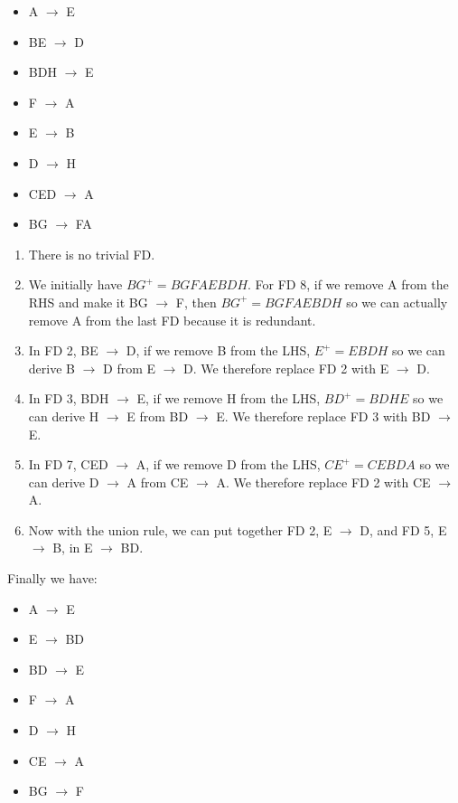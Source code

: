 \documentclass[11pt]{article}
\begin{document}
\begin{enumerate}
{{\begin{itemize}
  \item A $\rightarrow$ E
  \item BE $\rightarrow$ D
  \item BDH $\rightarrow$ E
  \item F $\rightarrow$ A
  \item E $\rightarrow$ B
  \item D $\rightarrow$ H
  \item CED $\rightarrow$ A
  \item BG $\rightarrow$ FA
\end{itemize}}}
    \begin{enumerate}
        \item There is no trivial FD.
        \item We initially have $BG^+ = BGFAEBDH$. For FD 8, if we remove A from the RHS and make it BG $\rightarrow$ F, then $BG^+ = BGFAEBDH$ so we can actually remove A from the last FD because it is redundant.
        \item In FD 2, BE $\rightarrow$ D, if we remove B from the LHS, $E^+ = EBDH$ so we can derive B $\rightarrow$ D from E $\rightarrow$ D. We therefore replace FD 2 with E $\rightarrow$ D.
        \item In FD 3, BDH $\rightarrow$ E, if we remove H from the LHS, $BD^+ = BDHE$ so we can derive H $\rightarrow$ E from BD $\rightarrow$ E. We therefore replace FD 3 with BD $\rightarrow$ E.
        \item In FD 7, CED $\rightarrow$ A, if we remove D from the LHS, $CE^+ = CEBDA$ so we can derive D $\rightarrow$ A from CE $\rightarrow$ A. We therefore replace FD 2 with CE $\rightarrow$ A.
        \item Now with the union rule, we can put together FD 2, E $\rightarrow$ D, and FD 5, E $\rightarrow$ B, in E $\rightarrow$ BD.
    \end{enumerate}
    Finally we have:
    \begin{itemize}
        \item A $\rightarrow$ E
        \item E $\rightarrow$ BD
        \item BD $\rightarrow$ E
        \item F $\rightarrow$ A
        \item D $\rightarrow$ H
        \item CE $\rightarrow$ A
        \item BG $\rightarrow$ F
    \end{itemize}\textbf{}
    

\end{enumerate}
\end{document}
